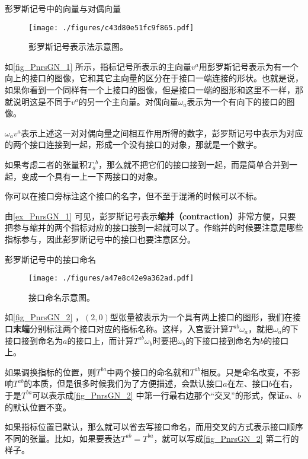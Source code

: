 \begin{example}{彭罗斯记号中的向量与对偶向量}\label{ex_PnrsGN_1}


\begin{figure}[ht]
\centering
\texttt{[image: ./figures/c43d80e51fc9f865.pdf]}
\caption{彭罗斯记号表示法示意图。} \label{fig_PnrsGN_1}
\end{figure}


如\autoref{fig_PnrsGN_1} 所示，指标记号所表示的主向量$v^a$用彭罗斯记号表示为有一个向上的接口的图像，它和其它主向量的区分在于接口一端连接的形状。也就是说，如果你看到一个同样有一个上接口的图像，但是接口一端的图形和这里不一样，那就说明这是不同于$v^a$的另一个主向量。对偶向量$\omega_a$表示为一个有向下的接口的图像。

$\omega_av^a$表示上述这一对对偶向量之间相互作用所得的数字，彭罗斯记号中表示为对应的两个接口连接到一起，形成一个没有接口的对象，那就是一个数字。

如果考虑二者的张量积$T_a^{\phantom{1}b}$，那么就不把它们的接口接到一起，而是简单合并到一起，变成一个具有一上一下两接口的对象。

你可以在接口旁标注这个接口的名字，但不至于混淆的时候可以不标。

\end{example}


由\autoref{ex_PnrsGN_1} 可见，彭罗斯记号表示\textbf{缩并（contraction）}非常方便，只要把参与缩并的两个指标对应的接口接到一起就可以了。作缩并的时候要注意是哪些指标参与，因此彭罗斯记号中的接口也要注意区分。



\begin{example}{彭罗斯记号中的接口命名}

\begin{figure}[ht]
\centering
\texttt{[image: ./figures/a47e8c42e9a362ad.pdf]}
\caption{接口命名示意图。} \label{fig_PnrsGN_2}
\end{figure}

如\autoref{fig_PnrsGN_2} ，$(2, 0)$型张量被表示为一个具有两上接口的图形，我们在接口\textbf{末端}分别标注两个接口对应的指标名称。这样，入宫要计算$T^{ab}\omega_{a}$，就把$\omega_{a}$的下接口接到命名为$a$的接口上，而计算$T^{ab}\omega_{b}$时要把$\omega_b$的下接口接到命名为$b$的接口上。

如果调换指标的位置，则$T^{ba}$中两个接口的命名就和$T^{ab}$相反。只是命名改变，不影响$T^{ab}$的本质，但是很多时候我们为了方便描述，会默认接口$a$在左、接口$b$在右，于是$T^{ba}$可以表示成\autoref{fig_PnrsGN_2} 中第一行最右边那个“交叉”的形式，保证$a$、$b$的默认位置不变。

如果指标位置已默认，那么就可以省去写接口命名，而用交叉的方式表示接口顺序不同的张量。比如，如果要表达$T^{ab}=T^{ba}$，就可以写成\autoref{fig_PnrsGN_2} 第二行的样子。

\end{example}




